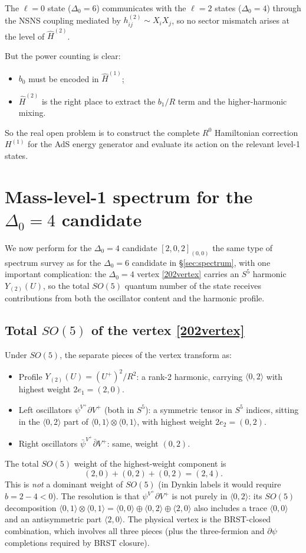 \documentclass[12pt]{article}
\def\be{\begin{equation}}
\def\ee{\end{equation}}
\newcommand{\D}{\ensuremath{\Delta}}
\begin{document}
The $\ell=0$ state ($\D_0=6$) communicates with the $\ell=2$ states ($\D_0=4$) through
the NSNS coupling mediated by $h^{(2)}_{ij}\sim X_iX_j$, so no sector mismatch arises
at the level of $\widehat H^{(2)}$.

But the power counting is clear:
\begin{itemize}
\item $b_0$ must be encoded in $\widehat H^{(1)}$;
\item $\widehat H^{(2)}$ is the right place to extract the $b_1/R$ term and the higher-harmonic mixing.
\end{itemize}
So the real open problem is to construct the complete $R^0$ Hamiltonian correction
$H^{(1)}$ for the AdS energy generator and evaluate its action on the relevant level-1 states.

\section{Mass-level-1 spectrum for the \texorpdfstring{$\D_0=4$}{Delta0=4} candidate}
\label{sec:delta4_spectrum}

We now perform for the $\D_0=4$ candidate $[2,0,2]_{(0,0)}$ the same type of spectrum
survey as for the $\D_0=6$ candidate in \S\ref{sec:spectrum}, with one important
complication: the $\D_0=4$ vertex \eqref{202vertex} carries an $S^5$ harmonic $Y_{(2)}(U)$,
so the total $SO(5)$ quantum number of the state receives contributions from both the
oscillator content and the harmonic profile.

\subsection{Total \texorpdfstring{$SO(5)$}{SO(5)} of the vertex \eqref{202vertex}}

Under $SO(5)$, the separate pieces of the vertex transform as:
\begin{itemize}
\item Profile $Y_{(2)}(U)=(U^+)^2/R^2$: a rank-2 harmonic, carrying
$\langle 0,2\rangle$ with highest weight $2e_1=(2,0)$.
\item Left oscillators $\psi^{V^+}\partial V^+$ (both in $S^5$): a symmetric tensor in $S^5$
indices, sitting in the $\langle 0,2\rangle$ part of $\langle 0,1\rangle\otimes\langle 0,1\rangle$,
with highest weight $2e_2=(0,2)$.
\item Right oscillators $\bar\psi^{V^+}\bar\partial V^+$: same, weight $(0,2)$.
\end{itemize}
The total $SO(5)$ weight of the highest-weight component is
\be
(2,0)+(0,2)+(0,2)=(2,4).
\ee
This is \emph{not} a dominant weight of $SO(5)$ (in Dynkin labels it
would require $b=2-4<0$). The resolution is that $\psi^{V^+}\partial V^+$
is not purely in $\langle 0,2\rangle$: its $SO(5)$ decomposition
$\langle 0,1\rangle\otimes\langle 0,1\rangle=\langle 0,0\rangle\oplus\langle 0,2\rangle\oplus\langle 2,0\rangle$
also includes a trace $\langle 0,0\rangle$ and an antisymmetric part $\langle 2,0\rangle$.
The physical vertex is the BRST-closed combination, which involves all three pieces
(plus the three-fermion and $\partial\psi$ completions required by BRST closure).
\end{document}
